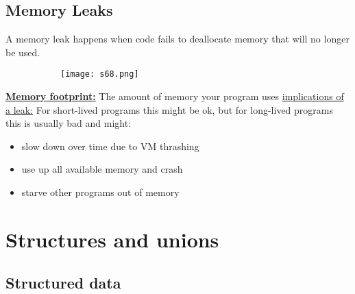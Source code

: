 \documentclass[8pt]{extreport}
\begin{document}
\subsection{Memory Leaks}
A memory leak happens when code fails to deallocate memory that will no longer be used.
\begin{figure}[H]
\centering
\begin{subfigure}[b]{0.4\linewidth}
\texttt{[image: s68.png]}
\end{subfigure}
\end{figure}
\underline{\textbf{Memory footprint:}} The amount of memory your program uses
\underline{implications of a leak:} For short-lived programs this might be ok, but for long-lived programs this is usually bad and might:
\begin{itemize}
\item slow down over time due to VM thrashing
\item use up all available memory and crash
\item starve other programs out of memory
\end{itemize}

\section{Structures and unions}

\subsection{Structured data}
 
\end{document}
